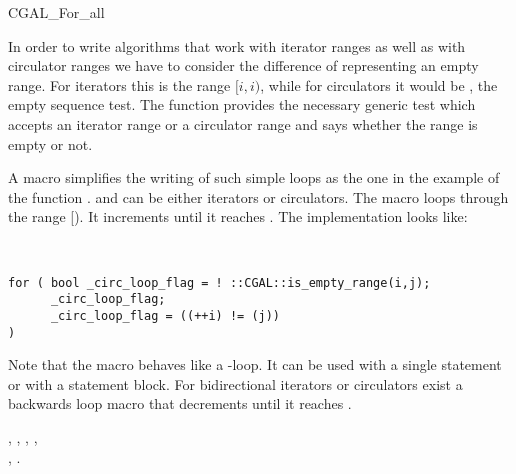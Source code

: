 
\begin{ccRefMacro}{CGAL_For_all}


\ccDefinition

In order to write algorithms that work with iterator ranges as well as
with circulator ranges we have to consider the difference of
representing an empty range. For iterators this is the range $[i,i)$,
while for circulators it would be , the empty sequence test.
The function  provides the necessary generic test
which accepts an iterator range or a circulator range and says whether
the range is empty or not.


A macro  simplifies the writing of such simple
loops as the one in the example of the function .
 and  can be either iterators or circulators. The macro
loops through the range [). It increments  until it
reaches . The implementation looks like:

  \ \ \ccTexHtml{$\equiv$}{:=} \ \
\begin{minipage}[t]{0.74\textwidth}
\begin{verbatim}
for ( bool _circ_loop_flag = ! ::CGAL::is_empty_range(i,j);
      _circ_loop_flag;
      _circ_loop_flag = ((++i) != (j)) 
)
\end{verbatim}
\end{minipage}%

Note that the macro behaves like a -loop. It can be used with
a single statement or with a statement block.  For bidirectional
iterators or circulators exist a backwards loop macro
 that decrements  until
it reaches \ccc{i}.


\ccSeeAlso

,
,
,
,\\
,
.


\end{ccRefMacro}

